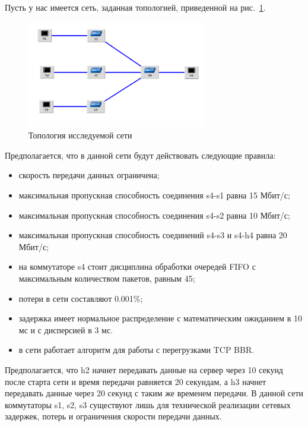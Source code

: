 Пусть у нас имеется сеть, заданная топологией, приведенной на
рис.~\ref{fig:30012}.

\begin{figure}[!h]
\centering
\includegraphics[width=0.7\textwidth]{image/ch03_02/example_topo.png}
\caption{Топология исследуемой сети}
\label{fig:30012}
\end{figure}

Предполагается, что в данной сети будут действовать следующие правила:
\begin{itemize}
\item скорость передачи данных ограничена;
\item максимальная пропускная способность соединения s4-s1 равна 15
  Мбит/с;
\item максимальная пропускная способность соединения s4-s2 равна 10
  Мбит/с;
\item максимальная пропускная способность соединений s4-s3 и s4-h4
  равна 20 Мбит/с;
\item на коммутаторе s4 стоит дисциплина обработки очередей FIFO с
  максимальным количеством пакетов, равным 45;
\item потери в сети составляют 0.001\%;
\item задержка имеет нормальное распределение с математическим
  ожиданием в 10 мс и с дисперсией в 3 мс.
\item в сети работает алгоритм для работы с перегрузками TCP BBR.
\end{itemize}

Предполагается, что h2 начнет передавать данные на сервер через 10
секунд после старта сети и время передачи равняется 20 секундам, а h3
начнет передавать данные через 20 секунд с таким же временем передачи. В
данной сети коммутаторы s1, s2, s3 существуют лишь для технической
реализации сетевых задержек, потерь и ограничения скорости передачи
данных.

